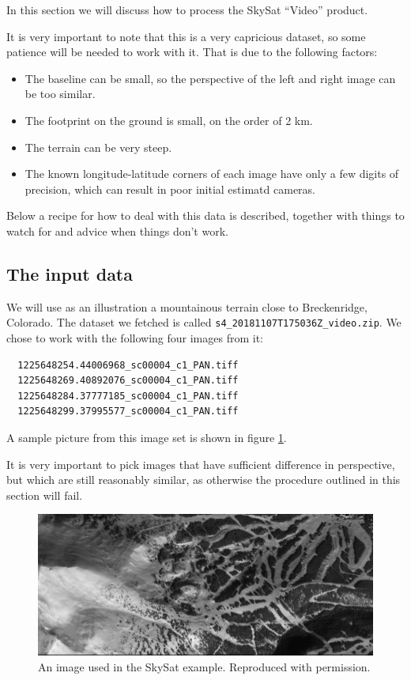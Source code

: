 In this section we will discuss how to process the SkySat ``Video'' product. 

It is very important to note that this is a very capricious dataset,
so some patience will be needed to work with it. That is due to the following factors:
\begin{itemize}
 \item The baseline can be small, so the perspective of the left and
  right image can be too similar. 
 \item The footprint on the ground is small, on the order of 2 km.
  \item The terrain can be very steep.
 \item The known longitude-latitude corners of each image have only a few digits of
precision, which can result in poor initial estimatd cameras.
\end{itemize}

Below a recipe for how to deal with this data is described, together with
things to watch for and advice when things don't work. 

\subsection{The input data}

We will use as an illustration a
mountainous terrain close to Breckenridge, Colorado. The dataset we
fetched is called \texttt{s4\_20181107T175036Z\_video.zip}. We chose to
work with the following four images from it:

\begin{verbatim}
  1225648254.44006968_sc00004_c1_PAN.tiff
  1225648269.40892076_sc00004_c1_PAN.tiff
  1225648284.37777185_sc00004_c1_PAN.tiff
  1225648299.37995577_sc00004_c1_PAN.tiff
\end{verbatim}

A sample picture from this image set is
shown in figure \ref{skysat-example}.

It is very important to pick images that have sufficient difference in
perspective, but which are still reasonably similar, as otherwise the
procedure outlined in this section will fail. 

\begin{figure}[h!]
\centering
\includegraphics[width=5.0in]{images/Breckenridge.jpg}
\caption{An image used in the SkySat example. Reproduced with permission.}
\label{skysat-example}
\end{figure}

